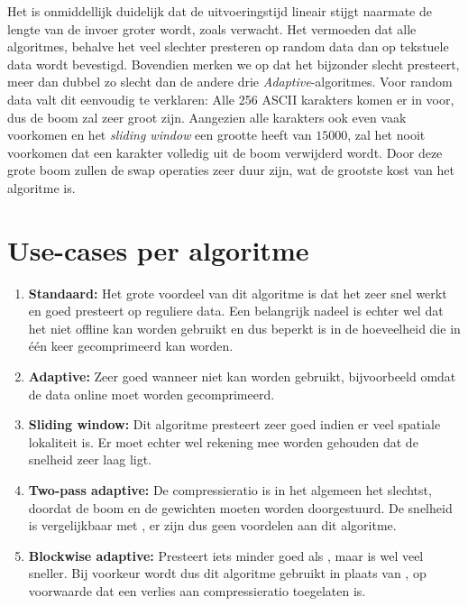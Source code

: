 \noindent Het is onmiddellijk duidelijk dat de uitvoeringstijd lineair stijgt naarmate de lengte van de invoer groter wordt, zoals verwacht. Het vermoeden dat alle algoritmes, behalve het \huffstd veel slechter presteren op random data dan op tekstuele data wordt bevestigd. Bovendien merken we op dat het \huffslid bijzonder slecht presteert, meer dan dubbel zo slecht dan de andere drie \emph{Adaptive}-algoritmes. Voor random data valt dit eenvoudig te verklaren: Alle 256 ASCII karakters komen er in voor, dus de boom zal zeer groot zijn. Aangezien alle karakters ook even vaak voorkomen en het \emph{sliding window} een grootte heeft van $15 000$, zal het nooit voorkomen dat een karakter volledig uit de boom verwijderd wordt. Door deze grote boom zullen de swap operaties zeer duur zijn, wat de grootste kost van het algoritme is.

\section{Use-cases per algoritme}
\begin{enumerate}
	\item \textbf{Standaard:} Het grote voordeel van dit algoritme is dat het zeer snel werkt en goed presteert op reguliere data. Een belangrijk nadeel is echter wel dat het niet offline kan worden gebruikt en dus beperkt is in de hoeveelheid die in één keer gecomprimeerd kan worden.
	\item \textbf{Adaptive:} Zeer goed wanneer \huffstd niet kan worden gebruikt, bijvoorbeeld omdat de data online moet worden gecomprimeerd.
	\item \textbf{Sliding window:} Dit algoritme presteert zeer goed indien er veel spatiale lokaliteit is. Er moet echter wel rekening mee worden gehouden dat de snelheid zeer laag ligt.
	\item \textbf{Two-pass adaptive:} De compressieratio is in het algemeen het slechtst, doordat de boom en de gewichten moeten worden doorgestuurd. De snelheid is vergelijkbaar met \huffadap, er zijn dus geen voordelen aan dit algoritme.
	\item \textbf{Blockwise adaptive:} Presteert iets minder goed als \huffslid, maar is wel veel sneller. Bij voorkeur wordt dus dit algoritme gebruikt in plaats van \huffslid, op voorwaarde dat een verlies aan compressieratio toegelaten is.
\end{enumerate}